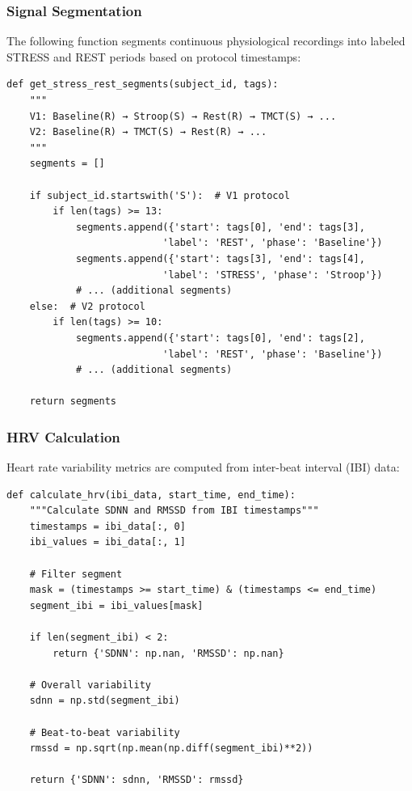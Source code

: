 \documentclass[12pt,letterpaper]{article}
\begin{document}
\subsubsection{Signal Segmentation}

The following function segments continuous physiological recordings into labeled STRESS and REST periods based on protocol timestamps:

\begin{verbatim}
def get_stress_rest_segments(subject_id, tags):
    """
    V1: Baseline(R) → Stroop(S) → Rest(R) → TMCT(S) → ...
    V2: Baseline(R) → TMCT(S) → Rest(R) → ...
    """
    segments = []

    if subject_id.startswith('S'):  # V1 protocol
        if len(tags) >= 13:
            segments.append({'start': tags[0], 'end': tags[3],
                           'label': 'REST', 'phase': 'Baseline'})
            segments.append({'start': tags[3], 'end': tags[4],
                           'label': 'STRESS', 'phase': 'Stroop'})
            # ... (additional segments)
    else:  # V2 protocol
        if len(tags) >= 10:
            segments.append({'start': tags[0], 'end': tags[2],
                           'label': 'REST', 'phase': 'Baseline'})
            # ... (additional segments)

    return segments
\end{verbatim}

\subsubsection{HRV Calculation}

Heart rate variability metrics are computed from inter-beat interval (IBI) data:

\begin{verbatim}
def calculate_hrv(ibi_data, start_time, end_time):
    """Calculate SDNN and RMSSD from IBI timestamps"""
    timestamps = ibi_data[:, 0]
    ibi_values = ibi_data[:, 1]

    # Filter segment
    mask = (timestamps >= start_time) & (timestamps <= end_time)
    segment_ibi = ibi_values[mask]

    if len(segment_ibi) < 2:
        return {'SDNN': np.nan, 'RMSSD': np.nan}

    # Overall variability
    sdnn = np.std(segment_ibi)

    # Beat-to-beat variability
    rmssd = np.sqrt(np.mean(np.diff(segment_ibi)**2))

    return {'SDNN': sdnn, 'RMSSD': rmssd}
\end{verbatim}
\end{document}
